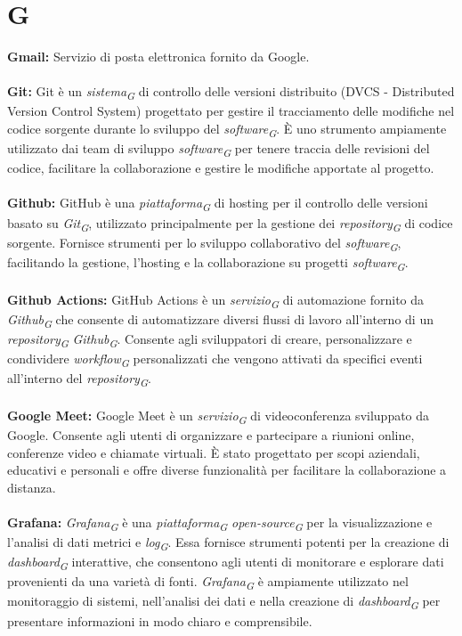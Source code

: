 \documentclass{article}
\begin{document}
\section*{G}
{}
\textbf{Gmail:} Servizio di posta elettronica fornito da Google.
\\
\\
\textbf{Git:} Git è un \textit{sistema}\textsubscript{\textit{G}} di controllo delle versioni distribuito (DVCS - Distributed Version Control System) progettato per gestire il tracciamento delle modifiche nel codice sorgente durante lo sviluppo del \textit{software}\textsubscript{\textit{G}}. È uno strumento ampiamente utilizzato dai team di sviluppo \textit{software}\textsubscript{\textit{G}} per tenere traccia delle revisioni del codice, facilitare la collaborazione e gestire le modifiche apportate al progetto.
\\
\\
\textbf{Github:} GitHub è una \textit{piattaforma}\textsubscript{\textit{G}} di hosting per il controllo delle versioni basato su \textit{Git}\textsubscript{\textit{G}}, utilizzato principalmente per la gestione dei \textit{repository}\textsubscript{\textit{G}} di codice sorgente. Fornisce strumenti per lo sviluppo collaborativo del \textit{software}\textsubscript{\textit{G}}, facilitando la gestione, l'hosting e la collaborazione su progetti \textit{software}\textsubscript{\textit{G}}.
\\
\\
\textbf{Github Actions:} GitHub Actions è un \textit{servizio}\textsubscript{\textit{G}} di automazione fornito da \textit{Github}\textsubscript{\textit{G}} che consente di automatizzare diversi flussi di lavoro all'interno di un \textit{repository}\textsubscript{\textit{G}} \textit{Github}\textsubscript{\textit{G}}. Consente agli sviluppatori di creare, personalizzare e condividere \textit{workflow}\textsubscript{\textit{G}} personalizzati che vengono attivati da specifici eventi all'interno del \textit{repository}\textsubscript{\textit{G}}.
\\
\\
\textbf{Google Meet:} Google Meet è un \textit{servizio}\textsubscript{\textit{G}} di videoconferenza sviluppato da Google. Consente agli utenti di organizzare e partecipare a riunioni online, conferenze video e chiamate virtuali. È stato progettato per scopi aziendali, educativi e personali e offre diverse funzionalità per facilitare la collaborazione a distanza. 
\\
\\
\textbf{Grafana:} \textit{Grafana}\textsubscript{\textit{G}} è una \textit{piattaforma}\textsubscript{\textit{G}} \textit{open-source}\textsubscript{\textit{G}} per la visualizzazione e l'analisi di dati metrici e \textit{log}\textsubscript{\textit{G}}. Essa fornisce strumenti potenti per la creazione di \textit{dashboard}\textsubscript{\textit{G}} interattive, che consentono agli utenti di monitorare e esplorare dati provenienti da una varietà di fonti. \textit{Grafana}\textsubscript{\textit{G}} è ampiamente utilizzato nel monitoraggio di sistemi, nell'analisi dei dati e nella creazione di \textit{dashboard}\textsubscript{\textit{G}} per presentare informazioni in modo chiaro e comprensibile.
\pagebreak
\end{document}
